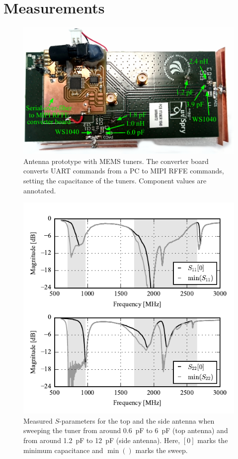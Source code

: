 \section{Measurements}
\label{sec:measurements}

\begin{figure}[tb]
    \centering
    \includegraphics{img/meas/lassedouble}
    \caption{Antenna prototype with MEMS tuners. The converter board converts UART commands from a PC to MIPI RFFE commands, setting the capacitance of the tuners. Component values are annotated.}
    \label{fig:pcb}
\end{figure}

\begin{figure}[tb]
    \centering
    \includegraphics{img/meas/sparams}
    \caption{Measured $S$-parameters for the top and the side antenna when sweeping the tuner from around \SI{0.6}{pF} to \SI{6}{pF} (top antenna) and from around \SI{1.2}{pF} to \SI{12}{pF} (side antenna). Here, $[0]$ marks the minimum capacitance and $\min()$ marks the sweep.}
    \label{fig:meas_sparams}
\end{figure}

